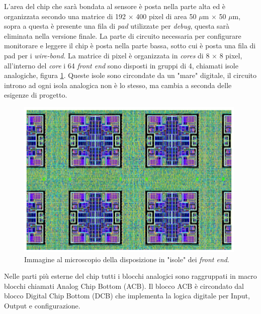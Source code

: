 L'area del chip che sarà bondata al sensore è posta nella parte alta ed è organizzata secondo una matrice di 192 $\times$ 400 pixel di area 50 $\mu$m $\times$ 50 $\mu$m, sopra a questa è presente una fila di \textit{pad} utilizzate per \textit{debug}, questa sarà eliminata nella versione finale. La parte di circuito necessaria per configurare monitorare e leggere il chip è posta nella parte bassa, sotto cui è posta una fila di pad per i \textit{wire-bond}. 
La matrice di pixel è organizzata in \textit{cores} di 8 $\times$ 8 pixel, all'interno del \textit{core} i 64 \textit{front end} sono disposti in gruppi di 4, chiamati isole analogiche, figura \ref{AnalogIsland}. 
Queste isole sono circondate da un "mare" digitale, il circuito introno ad ogni isola analogica non è lo stesso, ma cambia a seconda delle esigenze di progetto. 
\begin{figure}
\centering
\includegraphics[scale=.5]{Immagini/AnalogIsland}
\caption{Immagine al microscopio della disposizione in "isole" dei \textit{front end}.}
\label{AnalogIsland}
\end{figure} 
Nelle parti più esterne del chip tutti i blocchi analogici sono raggruppati in macro blocchi chiamati Analog Chip Bottom (ACB). Il blocco ACB è circondato dal blocco Digital Chip Bottom (DCB) che implementa la logica digitale per Input, Output e configurazione. 

